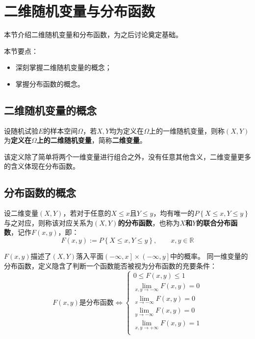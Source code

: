 \section{二维随机变量与分布函数}

本节介绍二维随机变量和分布函数，为之后讨论奠定基础。

本节要点：
\begin{itemize}
    \item 深刻掌握二维随机变量的概念；
    \item 掌握分布函数的概念。
\end{itemize}

\subsection{二维随机变量的概念}

\begin{definition}[二维随机变量]
设随机试验$E$的样本空间$\varOmega $，若$X,Y$均为定义在$\varOmega $上的一维随机变量，则称$\left( X,Y \right) $为{\bf 定义在$\varOmega $上的二维随机变量}，简称{\bf 二维变量}。
\end{definition}

该定义除了简单将两个一维变量进行组合之外，没有任意其他含义，二维变量更多的含义体现在分布函数。

\subsection{分布函数的概念}

\begin{definition}[分布函数]
设二维变量$\left( X,Y \right) $，若对于任意的$X\leqslant x$且$Y\leqslant y$，均有唯一的$P\left\{ X\leqslant x,Y\leqslant y \right\} $与之对应，则称该对应关系为{\bf $\left( X,Y \right) $的分布函数}，也称为{\bf $X$和$Y$的联合分布函数}，记作$F\left( x,y \right) $，即：
\[
F\left( x,y \right) := P\left\{ X\leqslant x,Y\leqslant y \right\} ,\qquad x,y\in \mathbb{R}
\]
\end{definition}

$F\left( x,y \right) $描述了$\left( X,Y \right) $落入平面$\left( -\infty ,x \right] \times \left( -\infty ,y \right] $中的概率。
同一维变量的分布函数，定义隐含了判断一个函数能否被视为分布函数的充要条件：
\[
F\left( x,y \right) \text{是分布函数}\Leftrightarrow \begin{cases}
	0\leqslant F\left( x,y \right) \leqslant 1\\
	\underset{x,y\rightarrow -\infty}{\lim}F\left( x,y \right) =0\\
	\underset{x\rightarrow -\infty}{\lim}F\left( x,y \right) =0\\
	\underset{y\rightarrow -\infty}{\lim}F\left( x,y \right) =0\\
	\underset{x,y\rightarrow +\infty}{\lim}F\left( x,y \right) =1\\
\end{cases}
\]

